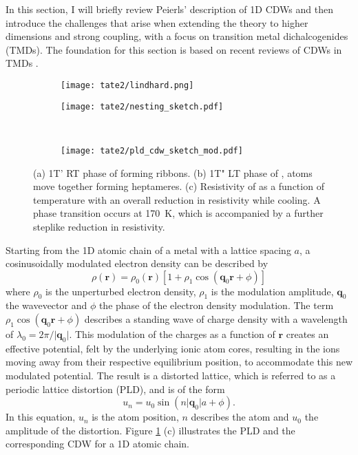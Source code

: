 In this section, I will briefly review Peierls' description of 1D CDWs and then introduce the challenges that arise when extending the theory to higher dimensions and strong coupling, with a focus on transition metal dichalcogenides (TMDs).
The foundation for this section is based on recent reviews of CDWs in TMDs \cite{rossnagel_origin_2011, canadell_importance_1992}.


\begin{figure}[t]
	\centering
	\begin{subfigure}[b]{0.45\textwidth}
		\texttt{[image: tate2/lindhard.png]}
	\end{subfigure}
	\hfill
	\begin{subfigure}[b]{0.5\textwidth}
		\texttt{[image: tate2/nesting\_sketch.pdf]}
	\end{subfigure}
	\\
	\begin{subfigure}[b]{0.9\textwidth}
		\texttt{[image: tate2/pld\_cdw\_sketch\_mod.pdf]}
	\end{subfigure}
	\caption{(a) 1T' RT phase of  forming ribbons. (b) 1T" LT phase of ,  atoms move together forming heptameres. (c) Resistivity of  as a function of temperature with an overall reduction in resistivity while cooling. A phase transition occurs at \qty{170}{\kelvin}, which is accompanied by a further steplike reduction in resistivity.}
	\label{fig:cdw_theory}
\end{figure}

Starting from the 1D atomic chain of a metal with a lattice spacing $a$, a cosinusoidally modulated electron density can be described by
\begin{equation}
	\rho(\mathbf{r}) = \rho_0(\mathbf{r})[1+\rho_1 \cos(\mathbf{q}_0\mathbf{r}+\phi)]
	\label{eq:cdw}
\end{equation}
where $\rho_0$ is the unperturbed electron density, $\rho_1$ is the modulation amplitude, $\mathbf{q}_0$ the wavevector and $\phi$ the phase of the electron density modulation.
The term $\rho_1 \cos(\mathbf{q}_0\mathbf{r}+\phi)$ describes a standing wave of charge density with a wavelength of $\lambda_0 = 2\pi/\lvert \mathbf{q}_0\rvert$.
This modulation of the charges as a function of $\mathbf{r}$ creates an effective potential, felt by the underlying ionic atom cores, resulting in the ions moving away from their respective equilibrium position, to accommodate this new modulated potential.
The result is a distorted lattice, which is referred to as a periodic lattice distortion (PLD), and is of the form
\begin{equation}
	u_n = u_0 \sin(n\lvert \mathbf{q}_0\rvert a+\phi).
	\label{eq:pld}
\end{equation}
In this equation, $u_n$ is the atom position, $n$ describes the atom and $u_0$ the amplitude of the distortion.
Figure \ref{fig:cdw_theory} (c) illustrates the PLD and the corresponding CDW for a 1D atomic chain.

